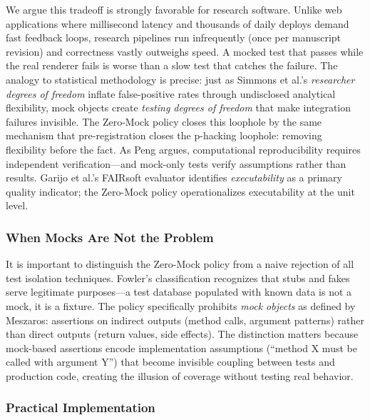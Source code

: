 \documentclass[
]{article}
\begin{document}
We argue this tradeoff is strongly favorable for research software.
Unlike web applications where millisecond latency and thousands of daily
deploys demand fast feedback loops, research pipelines run infrequently
(once per manuscript revision) and correctness vastly outweighs speed. A
mocked test that passes while the real renderer fails is worse than a
slow test that catches the failure. The analogy to statistical
methodology is precise: just as Simmons et al.'s \emph{researcher
degrees of freedom} \citep{simmons2011falsepositive} inflate
false-positive rates through undisclosed analytical flexibility, mock
objects create \emph{testing degrees of freedom} that make integration
failures invisible. The Zero-Mock policy closes this loophole by the
same mechanism that pre-registration \citep{nosek2018preregistration}
closes the p-hacking loophole: removing flexibility before the fact. As
Peng \citep{peng2011reproducible} argues, computational reproducibility
requires independent verification---and mock-only tests verify
assumptions rather than results. Garijo et al.'s FAIRsoft evaluator
\citep{garijo2024fairsoft} identifies \emph{executability} as a primary
quality indicator; the Zero-Mock policy operationalizes executability at
the unit level.

\subsubsection{When Mocks Are Not the
Problem}\label{when-mocks-are-not-the-problem}

It is important to distinguish the Zero-Mock policy from a naive
rejection of all test isolation techniques. Fowler's classification
\citep{martin2008clean} recognizes that stubs and fakes serve legitimate
purposes---a test database populated with known data is not a mock, it
is a fixture. The policy specifically prohibits \emph{mock objects} as
defined by Meszaros: assertions on indirect outputs (method calls,
argument patterns) rather than direct outputs (return values, side
effects). The distinction matters because mock-based assertions encode
implementation assumptions (``method X must be called with argument Y'')
that become invisible coupling between tests and production code,
creating the illusion of coverage without testing real behavior.

\subsubsection{Practical Implementation}\label{practical-implementation}
\end{document}
